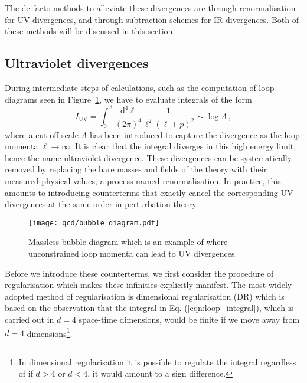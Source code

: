 \documentclass[main.tex]{subfiles}
\begin{document}
    The de facto methods to alleviate these
    divergences are through renormalisation
    for UV divergences, and through subtraction
    schemes for IR divergences. Both of these
    methods will be discussed in this section.

\subsection{Ultraviolet divergences}\label{sec:UV}
    During intermediate steps of calculations,
    such as the computation of loop diagrams seen in
    Figure~\ref{fig:bubble_diagram},
    we have to evaluate integrals of the form
    \begin{equation}\label{eqn:loop_integral}
        I_{\mathrm{UV}} = \int_{0}^{\Lambda} \dfrac{\mathrm{d}^{4}\ell}{(2\pi)^{4}}\dfrac{1}{\ell^{2}(\ell+p)^{2}} \sim \log{\Lambda} \, ,
    \end{equation}
    where a cut-off scale $\Lambda$ has been introduced to
    capture the divergence as the loop momenta
    $\ell \rightarrow \infty$. It is clear that the
    integral diverges in this high energy limit,
    hence the name ultraviolet divergence.
    These divergences can be systematically
    removed by replacing the bare masses
    and fields of the theory with their measured
    physical values, a process named renormalisation.
    In practice, this amounts to introducing
    counterterms that exactly cancel the corresponding
    UV divergences at the same order in perturbation
    theory.

    \begin{figure}
        \texttt{[image: qcd/bubble\_diagram.pdf]}
        \caption{Massless bubble diagram which is an example of where unconstrained
        loop momenta can lead to UV divergences.}
        \label{fig:bubble_diagram}
    \end{figure}

    Before we introduce these counterterms, we
    first consider the procedure of regularisation
    which makes these infinities explicitly manifest.
    The most widely adopted method of regularisation
    is dimensional regularisation (DR) \cite{tHooft:1972tcz} which
    is based on the observation that the integral
    in Eq. (\ref{eqn:loop_integral}), which is carried
    out in $d=4$ space-time dimensions, would be finite
    if we move away from $d=4$ dimensions\footnote{In dimensional regularisation it is possible to regulate
    the integral regardless of if $d > 4$ or $d < 4$, it would amount
    to a sign difference.}.
\end{document}
